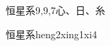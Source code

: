 \begin{entry}{恒星系}{9,9,7}{⼼、⽇、⽷}
  \begin{phonetics}{恒星系}{heng2xing1xi4}
  \end{phonetics}
\end{entry}
